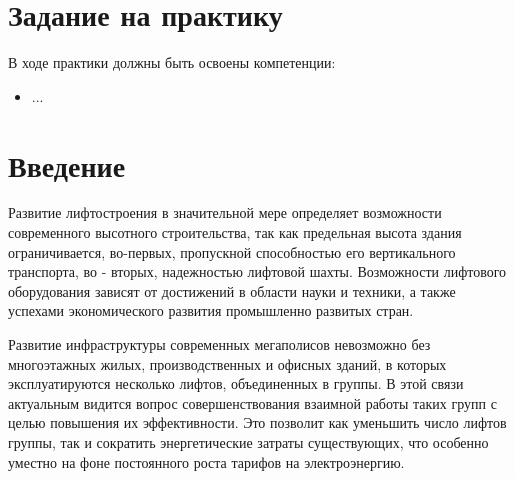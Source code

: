 \section{Задание на практику}
	В ходе практики должны быть освоены компетенции:
		\begin{itemize}
			\item ...
		\end{itemize}

\newpage
\section{Введение}

	Развитие лифтостроения в значительной мере определяет возможности современного высотного строительства,
		так как предельная высота здания ограничивается, во-первых, пропускной способностью его вертикального транспорта,
		во - вторых, надежностью лифтовой шахты. Возможности лифтового оборудования зависят от достижений в области
		науки и техники, а также успехами экономического развития промышленно развитых стран.

	Развитие инфраструктуры современных мегаполисов невозможно без многоэтажных жилых, производственных и офисных зданий,
		в которых эксплуатируются несколько лифтов, объединенных в группы. В этой связи актуальным видится вопрос
		совершенствования взаимной работы таких групп с целью повышения их эффективности.
		Это позволит как уменьшить число лифтов группы, так и сократить энергетические затраты существующих,
		что особенно уместно на фоне постоянного роста тарифов на электроэнергию.
